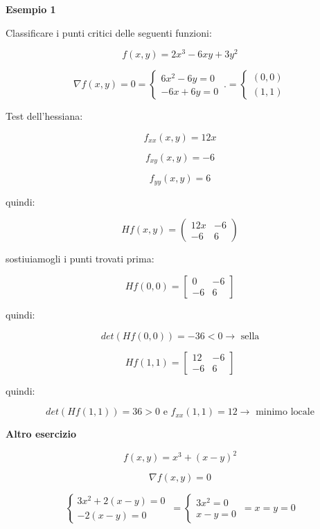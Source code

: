 \documentclass[../appunti-analisi.tex]{subfiles}
\begin{document}
\textbf{Esempio 1} 

Classificare i punti critici delle seguenti funzioni:

\[
    f(x,y) = 2x^{3}-6xy + 3y^{2}
\]

\[
    \nabla f(x,y)=0 = \begin{cases}
               6x^{2}-6y=0\\
               -6x + 6y =0
        \end{cases}\,. = \begin{cases}
        (0,0)\\
        (1,1)
        \end{cases}
\]

Test dell'hessiana:

\[
    f_{xx}(x,y) = 12x
\]

\[
    f_{xy}(x,y)= -6
\]

\[
    f_{yy}(x,y) = 6
\]

quindi:

\[
    H f(x,y) = \begin{pmatrix}
    12x & -6\\
    -6 & 6 
    \end{pmatrix}
\]

sostiuiamogli i punti trovati prima:

\[
    Hf(0,0) = \begin{bmatrix}
    0 & -6\\
    -6 & 6
    \end{bmatrix}
\]

quindi:

\[
    det (Hf(0,0)) = -36 <0 \rightarrow \text{ sella}
\]

\[
    Hf(1,1) = \begin{bmatrix}
    12 & -6\\
    -6 & 6
    \end{bmatrix}
\]

quindi:

\[
    det (Hf(1,1)) = 36 >0 \text{ e } f_{xx}(1,1) = 12 \rightarrow \text{ minimo locale}
\]

\textbf{Altro esercizio} 

\[
    f(x,y) = x^{3} + (x-y)^{2}
\]

\[
    \nabla f(x,y)=0
\]

\[
        \begin{cases}
    3x^{2}+2(x-y) = 0\\
    -2(x-y) = 0
        \end{cases}\, = \begin{cases}
    3x^{2}= 0\\
    x-y= 0
        \end{cases}\, = x = y =0
\]
\end{document}
